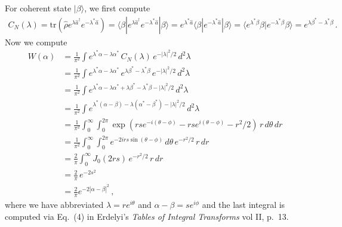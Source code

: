 \documentclass[11pt, oneside]{book}
\theoremstyle{break}
\theoremstyle{break}
\begin{document}
\chapter{}
For coherent state $|\beta\rangle$, we first compute
\begin{align}
C_N(\lambda) = \text{tr}(\hat{\rho} e^{\lambda \hat{a}^\dagger}e^{-\lambda^* \hat{a}}) = \langle \beta | e^{\lambda \hat{a}^\dagger}e^{-\lambda^* \hat{a}} | \beta\rangle = e^{\lambda^* \hat{a}}\langle \beta | e^{-\lambda^* \hat{a}}|\beta \rangle =\langle e^{\lambda^* \beta} \beta | e^{-\lambda^* \beta}\beta \rangle = e^{\lambda \beta^* - \lambda ^*\beta}\,.  
\end{align}
Now we compute
\begin{align*}
W(\alpha) 
&= \frac{1}{\pi^2}\int e^{\lambda^* \alpha - \lambda \alpha^*} \, C_N(\lambda) \, e^{-|\lambda|^2/2}\, d^2 \lambda\\
&= \frac{1}{\pi^2}\int e^{\lambda^* \alpha - \lambda \alpha^*} \, e^{\lambda \beta^* - \lambda ^*\beta} \, e^{-|\lambda|^2/2}\, d^2 \lambda\\
&= \frac{1}{\pi^2}\int e^{\lambda^* \alpha - \lambda \alpha^*+\lambda \beta^* - \lambda ^*\beta-|\lambda|^2/2}\, d^2 \lambda\\
&= \frac{1}{\pi^2}\int e^{\lambda^*(\alpha-\beta) - \lambda(\alpha^*-\beta^*)
-|\lambda|^2/2}\, d^2 \lambda\\
&= \frac{1}{\pi^2}\int_0^\infty \int_0^{2\pi}  \exp(rs e^{-i (\theta-\phi)} - r s e^{i(\theta-\phi)} - r^2/2)\, r\, d\theta\, dr\\
&= \frac{1}{\pi^2}\int_0^\infty \int_0^{2\pi} e^{-2i rs \sin(\theta- \phi)}\, d\theta\,  e^{-r^2/2}\, r \, dr\\
&= \frac{2}{\pi}\int_0^\infty J_0(2rs) \, e^{-r^2/2}\, r\, dr\\
&=  \frac{2}{\pi}\, e^{-2s^2}\\
&= \frac{2}{\pi}e^{-2|\alpha-\beta|^2}\,,
\end{align*}
where we have abbreviated $\lambda = re^{i\theta}$ and $\alpha-\beta = se^{i\phi}$ and the last integral is computed via Eq.\ (4) in Erdelyi's \textit{Tables of Integral Transforms} vol II, p.\ 13. 
\end{document}
